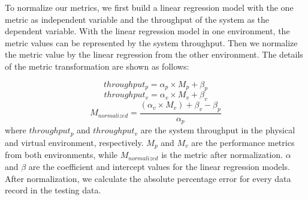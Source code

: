 

To normalize our metrics, we first build a linear regression model with the one metric as independent variable and the throughput of the system as the dependent variable. With the linear regression model in one environment, the metric values can be represented by the system throughput. Then we normalize the metric value by the linear regression from the other environment. The details of the metric transformation are shown as follows:

\begin{equation*}
throughput_{p}= \alpha_{p} \times M_{p} + \beta_{p}
\end{equation*}
\vspace{-0.4cm}
\begin{equation*}
throughput_{v}= \alpha_{v} \times M_{v} + \beta_{v}
\end{equation*}
\vspace{-0.4cm}
\begin{equation*}
M_{normalized} = \frac{(\alpha_{v} \times M_{v})+\beta_{v}-\beta_{p}}{\alpha_{p}}
	\end{equation*}
where $throughput_{p}$ and $throughput_{v}$ are the system throughput in the physical and virtual environment, respectively. $M_{p}$ and $M_{v}$ are the performance metrics from both environments, while $M_{normalized}$ is the metric after normalization. $\alpha$ and $\beta$ are the coefficient and intercept values for the linear regression models. After normalization, we calculate the absolute percentage error for every data record in the testing data.







